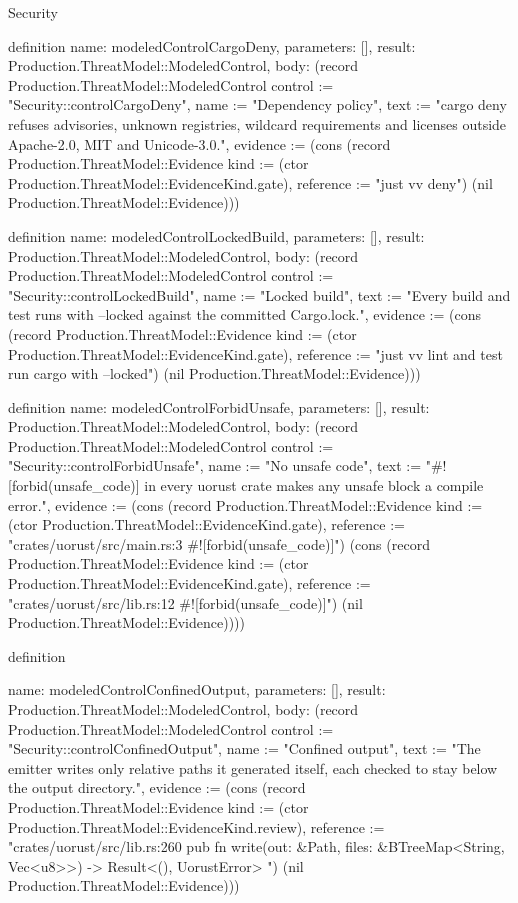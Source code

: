 \begin{lexlean}{Security}
\begin{semanticmodule}
definition{
  name: modeledControlCargoDeny,
  parameters: [],
  result: Production.ThreatModel::ModeledControl,
  body: (record Production.ThreatModel::ModeledControl {control := "Security::controlCargoDeny", name := "Dependency policy", text := "cargo deny refuses advisories, unknown registries, wildcard requirements and licenses outside Apache-2.0, MIT and Unicode-3.0.", evidence := (cons (record Production.ThreatModel::Evidence {kind := (ctor Production.ThreatModel::EvidenceKind.gate), reference := "just vv deny"}) (nil Production.ThreatModel::Evidence))})
}

definition{
  name: modeledControlLockedBuild,
  parameters: [],
  result: Production.ThreatModel::ModeledControl,
  body: (record Production.ThreatModel::ModeledControl {control := "Security::controlLockedBuild", name := "Locked build", text := "Every build and test runs with --locked against the committed Cargo.lock.", evidence := (cons (record Production.ThreatModel::Evidence {kind := (ctor Production.ThreatModel::EvidenceKind.gate), reference := "just vv lint and test run cargo with --locked"}) (nil Production.ThreatModel::Evidence))})
}

definition{
  name: modeledControlForbidUnsafe,
  parameters: [],
  result: Production.ThreatModel::ModeledControl,
  body: (record Production.ThreatModel::ModeledControl {control := "Security::controlForbidUnsafe", name := "No unsafe code", text := "#![forbid(unsafe_code)] in every uorust crate makes any unsafe block a compile error.", evidence := (cons (record Production.ThreatModel::Evidence {kind := (ctor Production.ThreatModel::EvidenceKind.gate), reference := "crates/uorust/src/main.rs:3 #![forbid(unsafe_code)]"}) (cons (record Production.ThreatModel::Evidence {kind := (ctor Production.ThreatModel::EvidenceKind.gate), reference := "crates/uorust/src/lib.rs:12 #![forbid(unsafe_code)]"}) (nil Production.ThreatModel::Evidence)))})
}

definition{
  name: modeledControlConfinedOutput,
  parameters: [],
  result: Production.ThreatModel::ModeledControl,
  body: (record Production.ThreatModel::ModeledControl {control := "Security::controlConfinedOutput", name := "Confined output", text := "The emitter writes only relative paths it generated itself, each checked to stay below the output directory.", evidence := (cons (record Production.ThreatModel::Evidence {kind := (ctor Production.ThreatModel::EvidenceKind.review), reference := "crates/uorust/src/lib.rs:260 pub fn write(out: &Path, files: &BTreeMap<String, Vec<u8>>) -> Result<(), UorustError> {"}) (nil Production.ThreatModel::Evidence))})
}

}
\end{semanticmodule}
\end{lexlean}
